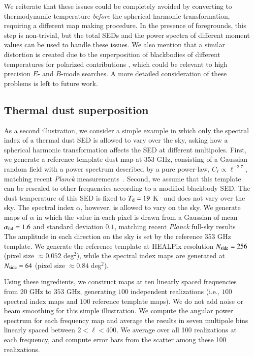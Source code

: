 \documentclass[usenatbib]{mn2e}
\begin{document}
We reiterate that these issues could be completely avoided by converting to thermodynamic temperature {\it before} the spherical harmonic transformation, requiring a different map making procedure. In the presence of foregrounds, this step is non-trivial, but the total SEDs and the power spectra of different moment values can be used to handle these issues. We also mention that a similar distortion is created due to the superposition of blackbodies of different temperatures for polarized contributions \citep{Chluba2015}, which could be relevant to high precision $E$- and $B$-mode searches. A more detailed consideration of these problems is left to future work. 

\vspace{0mm}
\subsection{Thermal dust superposition}
\label{sec:dust_superposition}

As a second illustration, we consider a simple example in which only the spectral index of a thermal dust SED is allowed to vary over the sky, asking how a spherical harmonic transformation affects the SED at different multipoles.  First, we generate a reference template dust map at $353$ GHz, consisting of a Gaussian random field with a power spectrum described by a pure power-law, $C_{\ell} \propto \ell^{-2.7}$, matching recent \emph{Planck} measurements~\citep{Planck2016GNILC}.  Second, we assume that this template can be rescaled to other frequencies according to a modified blackbody SED.  The dust temperature of this SED is fixed to $T_{\rm d} = 19$ K~\citep{Planck2016GNILC} and does not vary over the sky.  The spectral index $\alpha$, however, is allowed to vary on the sky.  We generate maps of $\alpha$ in which the value in each pixel is drawn from a Gaussian of mean $\alpha_{\rm fid} = 1.6$ and standard deviation $0.1$, matching recent \emph{Planck} full-sky results~\citep{Planck2016GNILC}.  The amplitude in each direction on the sky is set by the reference 353 GHz template.  We generate the reference template at HEALPix resolution $N_{\rm side} = 256$ (pixel size $\approx 0.052$ deg${}^2$), while the spectral index maps are generated at $N_{\rm side} = 64$ (pixel size $\approx 0.84$ deg${}^2$).

Using these ingredients, we construct maps at ten linearly spaced frequencies from $20$ GHz to $353$ GHz, generating $100$ independent realizations (i.e., $100$ spectral index maps and $100$ reference template maps).  We do not add noise or beam smoothing for this simple illustration.  We compute the angular power spectrum for each frequency map and average the results in seven multipole bins linearly spaced between $2 < \ell < 400$.  We average over all 100 realizations at each frequency, and compute error bars from the scatter among these 100 realizations.
\end{document}
